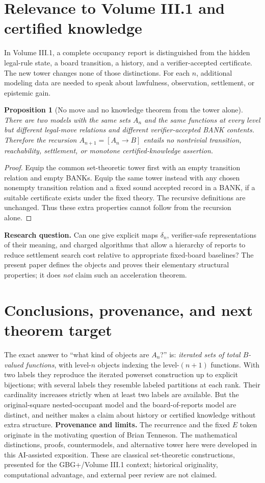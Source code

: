 \documentclass[11pt]{article}
\newtheorem{proposition}[theorem]{Proposition}
\theoremstyle{definition}
\newcommand{\Fun}[2]{[#1\to #2]}
\begin{document}
\section{Relevance to Volume III.1 and certified knowledge}
In Volume III.1, a complete occupancy report is distinguished from the hidden legal-rule state, a board transition, a history, and a verifier-accepted certificate. The new tower changes none of those distinctions. For each $n$, additional modeling data are needed to speak about lawfulness, observation, settlement, or epistemic gain.
\begin{proposition}[No move and no knowledge theorem from the tower alone]
There are two models with the same sets $A_n$ and the same functions at every level but different legal-move relations and different verifier-accepted BANK contents. Therefore the recursion $A_{n+1}=\Fun{A_n}{B}$ entails no nontrivial transition, reachability, settlement, or monotone certified-knowledge assertion.
\end{proposition}
\begin{proof}Equip the common set-theoretic tower first with an empty transition relation and empty BANKs. Equip the same tower instead with any chosen nonempty transition relation and a fixed sound accepted record in a BANK, if a suitable certificate exists under the fixed theory. The recursive definitions are unchanged. Thus these extra properties cannot follow from the recursion alone.\end{proof}
\noindent\textbf{Research question.} Can one give explicit maps $\delta_n$, verifier-safe representations of their meaning, and charged algorithms that allow a hierarchy of reports to reduce settlement search cost relative to appropriate fixed-board baselines? The present paper defines the objects and proves their elementary structural properties; it does \emph{not} claim such an acceleration theorem.

\section{Conclusions, provenance, and next theorem target}
The exact answer to ``what kind of objects are $A_n$?'' is: \emph{iterated sets of total $B$-valued functions}, with level-$n$ objects indexing the level-$(n+1)$ functions. With two labels they reproduce the iterated powerset construction up to explicit bijections; with several labels they resemble labeled partitions at each rank. Their cardinality increases strictly when at least two labels are available. But the original-square nested-occupant model and the board-of-reports model are distinct, and neither makes a claim about history or certified knowledge without extra structure.
\medskip
\noindent\textbf{Provenance and limits.} The recurrence and the fixed $E$ token originate in the motivating question of Brian Tenneson. The mathematical distinctions, proofs, countermodels, and alternative tower here were developed in this AI-assisted exposition. These are classical set-theoretic constructions, presented for the GBG+/Volume III.1 context; historical originality, computational advantage, and external peer review are not claimed.
\end{document}
